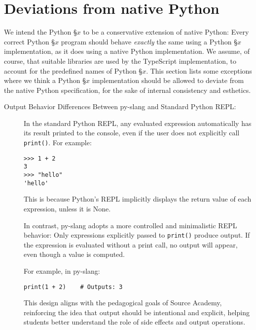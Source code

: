 \section*{Deviations from native Python}

We intend the Python \S $x$ to be a conservative extension of 
native Python: Every correct Python \S $x$ program should behave 
\emph{exactly} the same using a Python \S $x$ implementation, as it does 
using a native Python implementation. We assume, of course, that 
suitable libraries are used by the TypeScript implementation, to 
account for the predefined names of Python \S $x$. 
This section lists some exceptions where we think a Python \S $x$ 
implementation should be allowed to deviate from the native Python 
specification, for the sake of internal consistency and esthetics.

\begin{description}
\item[{Output Behavior Differences Between py-slang and Standard Python REPL:}]
  In the standard Python REPL, any evaluated expression automatically has its 
  result printed to the console, even if the user does not explicitly call 
  \texttt{print()}. For example:

  \begin{lstlisting}
>>> 1 + 2
3
>>> "hello"
'hello'
  \end{lstlisting}

  This is because Python's REPL implicitly displays the return value of each 
  expression, unless it is None.

  In contrast, py-slang adopts a more controlled and minimalistic REPL behavior:
  Only expressions explicitly passed to \texttt{print()} produce output. If the 
  expression is evaluated without a print call, no output will appear, even 
  though a value is computed.

  For example, in py-slang:

  \begin{lstlisting}
print(1 + 2)  	# Outputs: 3
  \end{lstlisting}

  This design aligns with the pedagogical goals of Source Academy, reinforcing 
  the idea that output should be intentional and explicit, helping students 
  better understand the role of side effects and output operations.
\end{description}
